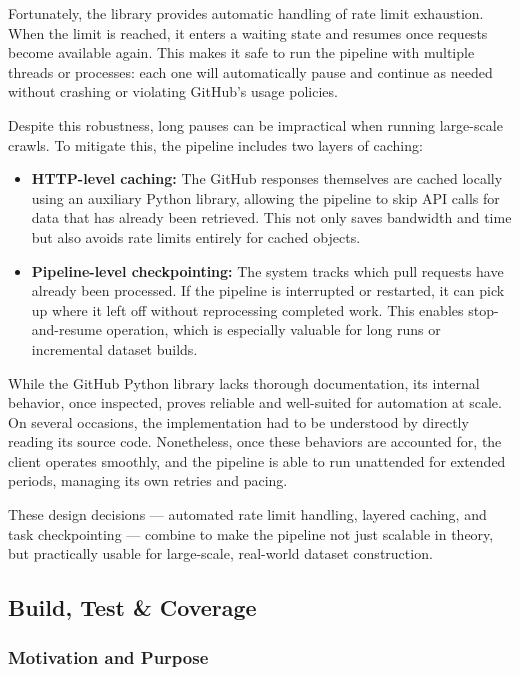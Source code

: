 Fortunately, the library provides automatic handling of rate limit exhaustion. When the limit is
reached, it enters a waiting state and resumes once requests become available again. This makes it
safe to run the pipeline with multiple threads or processes: each one will automatically pause and
continue as needed without crashing or violating GitHub’s usage policies.

Despite this robustness, long pauses can be impractical when running large-scale crawls. To mitigate
this, the pipeline includes two layers of caching:

\begin{itemize}
	\item \textbf{HTTP-level caching:} The GitHub responses themselves are cached locally using an
	      auxiliary Python library, allowing the pipeline to skip API calls for data that has already
	      been retrieved. This not only saves bandwidth and time but also avoids rate limits entirely
	      for cached objects.

	\item \textbf{Pipeline-level checkpointing:} The system tracks which pull requests have already
	      been processed. If the pipeline is interrupted or restarted, it can pick up where it left
	      off without reprocessing completed work. This enables stop-and-resume operation, which is
	      especially valuable for long runs or incremental dataset builds.
\end{itemize}

While the GitHub Python library lacks thorough documentation, its internal behavior, once inspected,
proves reliable and well-suited for automation at scale. On several occasions, the implementation
had to be understood by directly reading its source code. Nonetheless, once these behaviors are
accounted for, the client operates smoothly, and the pipeline is able to run unattended for extended
periods, managing its own retries and pacing.

These design decisions — automated rate limit handling, layered caching, and task
checkpointing — combine to make the pipeline not just scalable in theory, but practically usable for
large-scale, real-world dataset construction.

\subsection{Build, Test \& Coverage}


\subsubsection{Motivation and Purpose}

